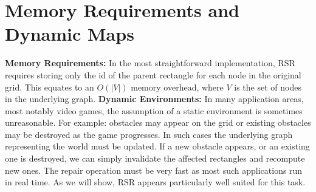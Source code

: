 \section{Memory Requirements and Dynamic Maps}
\label{sec:memory}
\textbf{Memory Requirements: }
In the most straightforward implementation, RSR requires storing only the id of the
parent rectangle for each node in the original grid. 
This equates to an $O(|V|)$ memory overhead, where $V$ is the set of nodes
in the underlying graph.
\newline \noindent
\textbf{Dynamic Environments: }
In many application areas, most notably video games, the assumption of a static 
environment is sometimes unreasonable.
For example: obstacles may appear on the grid or existing obstacles may be
destroyed as the game progresses.
In such cases the underlying graph representing the world must be updated.
If a new obstacle appears, or an existing one is destroyed,
we can simply invalidate the affected rectangles and recompute new ones.
The repair operation must be very fast as most such applications run in real
time. As we will show, RSR appears particularly well suited for this task.
